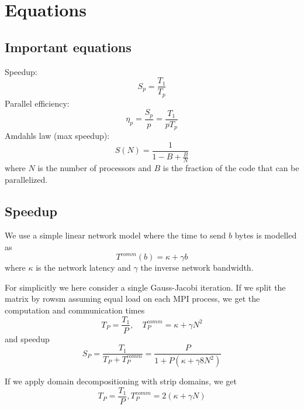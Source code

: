 
\section{Equations} %
\label{sec:equations}

\subsection{Important equations} %
\label{sub:important_equations}
Speedup:
\begin{equation}
  S_p = \frac{T_1}{T_p}
\end{equation}
Parallel efficiency:
\begin{equation}
  \eta_p = \frac{S_p}{p} = \frac{T_1}{pT_p}
\end{equation}
Amdahls law (max speedup):
\begin{equation}
  S(N) = \frac{1}{1-B + \frac{B}{N}}
\end{equation}
where $N$ is the number of processors and $B$ is the fraction of the code that can be parallelized.

\subsection{Speedup} %
\label{sub:speedup}

We use a simple linear network model where the time to send $b$ bytes is modelled as
\begin{equation}
  T^{comm}(b) = \kappa + \gamma b
\end{equation}
where $\kappa$ is the network latency and $\gamma$ the inverse network bandwidth.

For simplicitly we here consider a single Gauss-Jacobi iteration. If we split the matrix by rowsm assuming equal load on each MPI process, we get the computation and communication times
\begin{equation}
  T_P = \frac{T_1}{P}, \quad T_P^{comm} = \kappa + \gamma N^2
\end{equation}
and speedup
\begin{equation}
  S_P = \frac{T_1}{T_P+T_P^{comm}} = \frac{P}{1+P(\kappa + \gamma 8N^2)}
\end{equation}

If we apply domain decompositioning with strip domains, we get
\begin{equation}
  T_P = \frac{T_1}{P}, T_P^{comm} = 2 (\kappa + \gamma N)
\end{equation}



